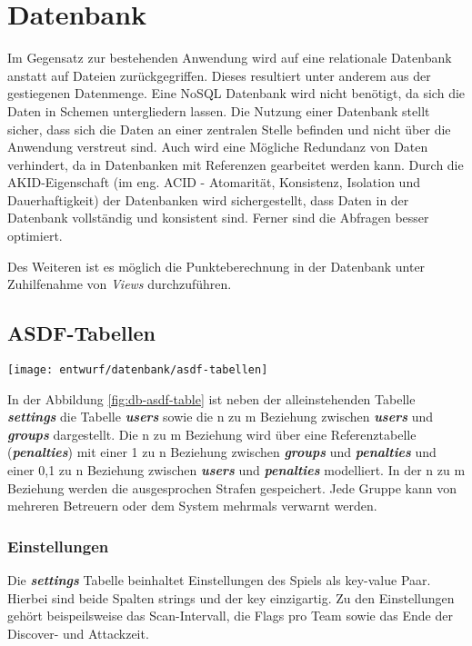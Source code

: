 \section{Datenbank}
Im Gegensatz zur bestehenden Anwendung wird auf eine relationale Datenbank anstatt auf Dateien zurückgegriffen. Dieses resultiert unter anderem aus der gestiegenen Datenmenge. Eine NoSQL Datenbank wird nicht benötigt, da sich die Daten in Schemen untergliedern lassen. Die Nutzung einer Datenbank stellt sicher, dass sich die Daten an einer zentralen Stelle befinden und nicht über die Anwendung verstreut sind. Auch wird eine Mögliche Redundanz von Daten verhindert, da in Datenbanken mit Referenzen gearbeitet werden kann. Durch die AKID-Eigenschaft (im eng. ACID - Atomarität, Konsistenz, Isolation und Dauerhaftigkeit) der Datenbanken wird sichergestellt, dass Daten in der Datenbank vollständig und konsistent sind. Ferner sind die Abfragen besser optimiert.

Des Weiteren ist es möglich die Punkteberechnung in der Datenbank unter Zuhilfenahme von \textit{Views} durchzuführen.

\subsection{ASDF-Tabellen}
\begin{center}
	\texttt{[image: entwurf/datenbank/asdf-tabellen]}
	\label{fig:db-asdf-table}
\end{center}

In der Abbildung \ref{fig:db-asdf-table} ist neben der alleinstehenden Tabelle \textbf{\textit{settings}} die Tabelle \textbf{\textit{users}} sowie die n zu m Beziehung zwischen \textbf{\textit{users}} und \textbf{\textit{groups}} dargestellt. Die n zu m Beziehung wird über eine Referenztabelle (\textbf{\textit{penalties}}) mit einer 1 zu n Beziehung zwischen \textbf{\textit{groups}} und \textbf{\textit{penalties}} und einer 0,1 zu n Beziehung zwischen \textbf{\textit{users}} und \textbf{\textit{penalties}} modelliert. In der n zu m Beziehung werden die ausgesprochen Strafen gespeichert. Jede Gruppe kann von mehreren Betreuern oder dem System mehrmals verwarnt werden.

\subsubsection{Einstellungen}
Die \textbf{\textit{settings}} Tabelle beinhaltet Einstellungen des Spiels als key-value Paar. Hierbei sind beide Spalten strings und der key einzigartig. Zu den Einstellungen gehört beispeilsweise das Scan-Intervall, die Flags pro Team sowie das Ende der Discover- und Attackzeit.

